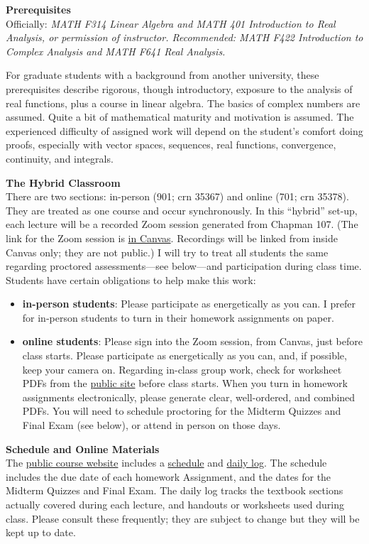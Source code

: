 \documentclass[12pt]{article}
\renewcommand{\emph}[1]{\textsf{\textbf{#1}}}
\newcommand{\localhead}[1]{\par\smallskip\textbf{#1} \smallskip\nobreak\\}%
\def\heading#1{\localhead{\large\emph{#1}}}
\begin{document}
\clearpage\newpage
\phantom{foo}
\heading{Prerequisites}
Officially: \textsl{MATH F314 Linear Algebra and MATH 401 Introduction to Real Analysis, or permission of instructor. Recommended: MATH F422 Introduction to Complex Analysis and MATH F641 Real Analysis.}

For graduate students with a background from another university, these prerequisites describe rigorous, though introductory, exposure to the analysis of real functions, plus a course in linear algebra.  The basics of complex numbers are assumed.  Quite a bit of mathematical maturity and motivation is assumed.  The experienced difficulty of assigned work will depend on the student's comfort doing proofs, especially with vector spaces, sequences, real functions, convergence, continuity, and integrals.


\heading{The Hybrid Classroom}
There are two sections: in-person (901; crn 35367) and online (701; crn 35378).  They are treated as one course and occur synchronously.  In this ``hybrid'' set-up, each lecture will be a recorded Zoom session generated from Chapman 107.  (The link for the Zoom session is \href{https://canvas.alaska.edu/courses/18441}{in Canvas}.  Recordings will be linked from inside Canvas only; they are not public.)  I will try to treat all students the same regarding proctored assessments---see below---and participation during class time.  Students have certain obligations to help make this work:
\begin{itemize}
\item \textbf{in-person students}: Please participate as energetically as you can.  I prefer for in-person students to turn in their homework assignments on paper.
\item \textbf{online students}:  Please sign into the Zoom session, from Canvas, just before class starts.  Please participate as energetically as you can, and, if possible, keep your camera on.  Regarding in-class group work, check for worksheet PDFs from the \href{https://bueler.github.io/fa/}{public site} before class starts.  When you turn in homework assignments electronically, please generate clear, well-ordered, and combined PDFs.  You will need to schedule proctoring for the Midterm Quizzes and Final Exam (see below), or attend in person on those days.
\end{itemize}

\heading{Schedule and Online Materials}
The \href{https://bueler.github.io/fa/}{public course website} includes a \href{https://bueler.github.io/nla/assets/general/S24/schedule.pdf}{schedule} and \href{https://bueler.github.io/fa/daily.html}{daily log}.  The schedule includes the due date of each homework Assignment, and the dates for the Midterm Quizzes and Final Exam.  The daily log tracks the textbook sections actually covered during each lecture, and handouts or worksheets used during class.  Please consult these frequently; they are subject to change but they will be kept up to date.
\end{document}
